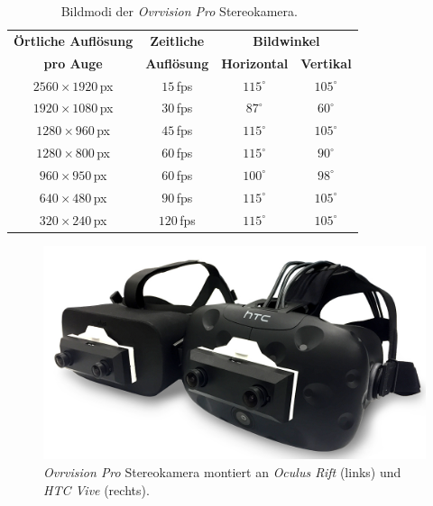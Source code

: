 \begin{table}
	\centering
	\begin{tabular}{|c|c|c|c|}
		\hline
		\Absatzbox{}
		\textbf{Örtliche Auflösung}& \textbf{Zeitliche} & \multicolumn{2}{c|}{\textbf{Bildwinkel}}\\
		\cline{3-4}
		\Absatzbox{}
		\textbf{pro Auge}& \textbf{Auflösung} & \textbf{Horizontal} & \textbf{Vertikal}\\
		\hline
		$2560\times1920$\,px & $15$\,fps & $115^\circ$ & $105^\circ$\\
		\hline
		$1920\times1080$\,px & $30$\,fps & $87^\circ$ & $60^\circ$\\
		\hline
		$1280\times960$\,px & $45$\,fps & $115^\circ$ & $105^\circ$\\
		\hline
		$1280\times800$\,px & $60$\,fps & $115^\circ$ & $90^\circ$\\
		\hline
		$960\times950$\,px & $60$\,fps & $100^\circ$ & $98^\circ$\\
		\hline
		$640\times480$\,px & $90$\,fps & $115^\circ$ & $105^\circ$\\
		\hline
		$320\times240$\,px & $120$\,fps & $115^\circ$ & $105^\circ$\\
		\hline
	\end{tabular}
	\caption{Bildmodi der \emph{Ovrvision Pro} Stereokamera.~\cite{website:ovrvisionProduct}}
	\label{tab:ovrRes}
\end{table}


\begin{figure}[H]
	\centering
	\includegraphics[width=\textwidth]{Bilder/ovr.jpg}			
		\caption{\emph{Ovrvision Pro} Stereokamera montiert an \emph{Oculus Rift} (links) und \emph{HTC Vive} (rechts).~\cite{website:ovrvision}}
		\label{fig:ovr}
\end{figure}
